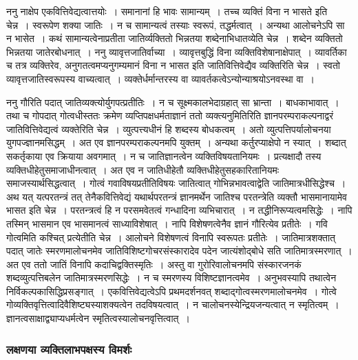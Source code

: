 				\begin{small}

					ननु नाक्षेप एकवित्तिवेद्यत्वात्तयोः~। समानानां हि भावः सामान्यम्~। तच्च व्यक्तिं विना न भासते इति चेन्न~। स्वरूपेण शक्या जातिः~। न च सामान्यत्वं तस्याः स्वरूपं, तद्धर्मत्वात्~। अन्यथा आलोचनेऽपि सा न भासेत~। कथं सामान्यत्वेनाप्रतीता जातिर्व्यक्तितो भिन्नतया शब्देनाभिधातव्येति चेन्न~। शब्देन व्यक्तितो भिन्नतया जातेरबोधनात्~। ननु व्यावृत्तजातिर्वाच्या~। व्यावृत्तबुद्धिं विना व्यक्तिविशेषानाक्षेपात्~। व्यावर्तिका च तत्र व्यक्तिरेव, अनुगतत्वमप्यनुगम्यमानं विना न भासत इति जातिवित्तिवेद्यैव व्यक्तिरिति चेन्न~। स्वतो व्यावृत्तजातिस्वरूपस्य वाच्यत्वात्~। व्यक्तेर्धर्मान्तरस्य वा व्यावर्तकत्वेऽन्योन्याश्रयोऽनवस्था वा~।
				
					ननु गौरिति पदात् जातिव्यक्त्योर्युगपत्प्रतीतिः~। न च सूक्ष्मकालभेदाग्रहात् सा भ्रान्ता~। बाधकाभावात्~। तथा च गोपदात् गोत्वधीस्ततः क्रमेण व्यप्तिपक्षधर्मताज्ञानं ततो व्यक्त्यनुमितिरिति ज्ञानपरम्पराकल्पनाद्वरं जातिवित्तिवेद्यत्वं व्यक्तेरिति चेन्न~। व्युत्पत्त्यधीनं हि शब्दस्य बोधकत्वम्~। अतो व्युत्पत्तिपर्यालोचनया युगपज्ज्ञानमसिद्धम्~। अत एव ज्ञानपरम्पराकल्पनमपि युक्तम्~। अन्यथा कर्तुरप्याक्षेपो न स्यात्~। शब्दात् सकर्तृकाया एव क्रियाया अवगमात्~। न च जातिज्ञानत्वेन व्यक्तिविषयतानियमः~। प्रत्यक्षादौ तस्य व्यक्तिधीहेतुसमाजाधीनत्वात्~। अत एव न जातिधीहेतौ व्यक्तिधीहेतुसहकारितानियमः समाजस्यार्थसिद्धत्वात्~। गोत्वं गवाविषयप्रतीतिविषयः जातित्वात् गोभिन्नभावत्वाद्वेति जातिमात्रधीसिद्धेश्च~। अथ यत् यत्परतन्त्रं तत् तेनैकवित्तिवेद्यं यथार्थपरतन्त्रं ज्ञानमर्थेन जातिश्च परतन्त्रेति व्यक्तौ  भासमानायामेव भासत इति चेन्न~। परतन्त्रत्वं हि न परसमवेतत्वं गन्धादिना व्यभिचारात्~। न तद्धीनिरूप्यत्वमसिद्धेः~। नापि तस्मिन् भासमान एव भासमानत्वं साध्याविशेषात्~। नापि विशेषणत्वेनैव ज्ञानं गौरित्येव प्रतीतेः~। गवि गोत्वमिति कश्चित् प्रत्येतीति चेन्न~। आलोचने विशेषणत्वं विनापि स्वरूपतः प्रतीतेः~। जातिमात्रशक्तात् पदात् जातेः स्मरणमालोचनमेव जातिविशिष्टगोचरसंस्कारादेव पदेन जात्यंशोद्बोधे सति जातिमात्रस्मरणात्~। अत एव ततो जातिं विनापि कदाचिद्वक्तिस्मृतिः~। अस्तु वा गुरोरिवालोचनमपि संस्कारजनकं शब्दव्युत्पत्तिबलेन जातिमात्रस्मरणसिद्धेः~। न च स्मरणस्य विशिष्टज्ञानत्वमेव~। अनुभवस्यापि तथात्वेन निर्विकल्पकासिद्धिप्रसङ्गात्~। एकवित्तिवेद्यत्वेऽपि प्रथमदर्शनवत् शब्दाद्गोत्वस्मरणमालोचनमेव~। गोत्वे गोव्यक्तिवृत्तित्वादिवैशिष्ट्यस्याशक्यत्वेन तदविषयत्वात्~। न चालोचनस्येन्द्रियजन्यत्वात् न स्मृतित्वम्~। ज्ञानत्वसाक्षाद्व्याप्यधर्मत्वेन स्मृतित्वस्यालोचनवृत्तित्वात्~।
				\end{small}
			
			\subsubsection{लक्षणया व्यक्तिलाभपक्षस्य विमर्शः}
			
